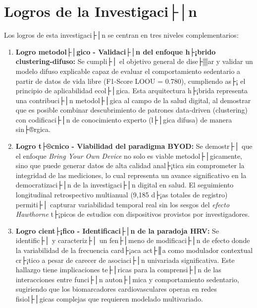 \section{Logros de la Investigaci├│n}
\label{sec:logros}

Los logros de esta investigaci├│n se centran en tres niveles complementarios:

\begin{enumerate}
    \item \textbf{Logro metodol├│gico - Validaci├│n del enfoque h├¡brido clustering-difuso:} Se cumpli├│ el objetivo general de dise├▒ar y validar un modelo difuso explicable capaz de evaluar el comportamiento sedentario a partir de datos de vida libre (F1-Score LOOU = 0.780), cumpliendo as├¡ el principio de aplicabilidad ecol├│gica. Esta arquitectura h├¡brida representa una contribuci├│n metodol├│gica al campo de la salud digital, al demostrar que es posible combinar descubrimiento de patrones data-driven (clustering) con codificaci├│n de conocimiento experto (l├│gica difusa) de manera sin├®rgica.
    
    \item \textbf{Logro t├®cnico - Viabilidad del paradigma BYOD:} Se demostr├│ que el enfoque \textit{Bring Your Own Device} no solo es viable metodol├│gicamente, sino que puede generar datos de alta calidad anal├¡tica sin comprometer la integridad de las mediciones, lo cual representa un avance significativo en la democratizaci├│n de la investigaci├│n digital en salud. El seguimiento longitudinal retrospectivo multianual (9,185 d├¡as totales de registro) permiti├│ capturar variabilidad temporal real sin los sesgos del \textit{efecto Hawthorne} t├¡picos de estudios con dispositivos provistos por investigadores.
    
    \item \textbf{Logro cient├¡fico - Identificaci├│n de la paradoja HRV:} Se identific├│ y caracteriz├│ un fen├│meno de modificaci├│n de efecto donde la variabilidad de la frecuencia card├¡aca act├║a como modulador contextual cr├¡tico a pesar de carecer de asociaci├│n univariada significativa. Este hallazgo tiene implicaciones te├│ricas para la comprensi├│n de las interacciones entre funci├│n auton├│mica y comportamiento sedentario, sugiriendo que los biomarcadores cardiovasculares operan en redes fisiol├│gicas complejas que requieren modelado multivariado.
    

\end{enumerate}
